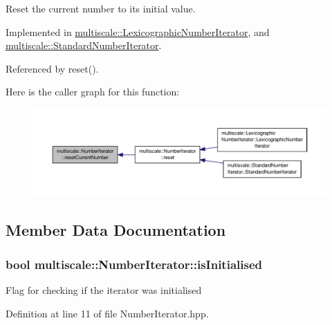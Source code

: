 Reset the current number to its initial value. 



Implemented in \hyperlink{classmultiscale_1_1LexicographicNumberIterator_a18311f68a49156a415c817a947abcd7d}{multiscale\-::\-Lexicographic\-Number\-Iterator}, and \hyperlink{classmultiscale_1_1StandardNumberIterator_a678d43170a27106e1d8c5475b7088d9e}{multiscale\-::\-Standard\-Number\-Iterator}.



Referenced by reset().



Here is the caller graph for this function\-:\nopagebreak
\begin{figure}[H]
\begin{center}
\leavevmode
\includegraphics[width=350pt]{classmultiscale_1_1NumberIterator_a21e658de178b6c957df5ea0482e6fbd6_icgraph}
\end{center}
\end{figure}




\subsection{Member Data Documentation}
\hypertarget{classmultiscale_1_1NumberIterator_ae3d929444e14677de0b616a059380f3f}{
\subsubsection[{is\-Initialised}]{\setlength{\rightskip}{0pt plus 5cm}bool multiscale\-::\-Number\-Iterator\-::is\-Initialised\hspace{0.3cm}{\ttfamily [protected]}}}\label{classmultiscale_1_1NumberIterator_ae3d929444e14677de0b616a059380f3f}
Flag for checking if the iterator was initialised 

Definition at line 11 of file Number\-Iterator.\-hpp.



